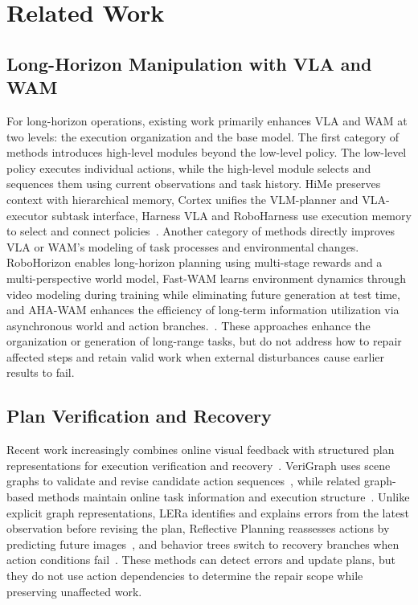 \documentclass[letterpaper,10pt,conference]{ieeeconf}
\begin{document}
\section{Related Work}
\subsection{Long-Horizon Manipulation with VLA and WAM}
For long-horizon operations, existing work primarily enhances VLA and WAM at two levels: the execution organization and the base model. The first category of methods introduces high-level modules beyond the low-level policy. The low-level policy executes individual actions, while the high-level module selects and sequences them using current observations and task history. HiMe preserves context with hierarchical memory, Cortex unifies the VLM-planner and VLA-executor subtask interface, Harness VLA and RoboHarness use execution memory to select and connect policies~\cite{ji2026hime,peng2026cortex,zhang2026harness,huang2026roboharness}. Another category of methods directly improves VLA or WAM's modeling of task processes and environmental changes. RoboHorizon enables long-horizon planning using multi-stage rewards and a multi-perspective world model, Fast-WAM learns environment dynamics through video modeling during training while eliminating future generation at test time, and AHA-WAM enhances the efficiency of long-term information utilization via asynchronous world and action branches.~\cite{chen2025robohorizon,yuan2026fast,cai2026aha}. These approaches enhance the organization or generation of long-range tasks, but do not address how to repair affected steps and retain valid work when external disturbances cause earlier results to fail.

\subsection{Plan Verification and Recovery}

Recent work increasingly combines online visual feedback with structured plan representations for execution verification and recovery~\cite{ahmad2025unified}. VeriGraph uses scene graphs to validate and revise candidate action sequences~\cite{ekpo2024verigraph}, while related graph-based methods maintain online task information and execution structure~\cite{booker2024embodiedrag,shirasaka2025spark,yang2026integrated,zhang2026atomic}. Unlike explicit graph representations, LERa identifies and explains errors from the latest observation before revising the plan, Reflective Planning reassesses actions by predicting future images~\cite{pchelintsev2025lera,feng2025reflective}, and behavior trees switch to recovery branches when action conditions fail~\cite{colledanchise2016behavior,iovino2022survey}. These methods can detect errors and update plans, but they do not use action dependencies to determine the repair scope while preserving unaffected work.
\end{document}
